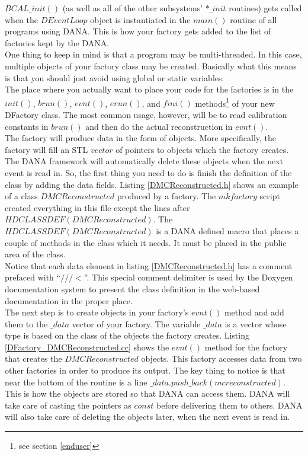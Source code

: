 \documentclass[12pt]{article}
\begin{document}
$BCAL\_init()$ (as well as all of the other subsystems' $*\_init$
routines) gets called when the $DEventLoop$ object is instantiated in
the $main()$ routine of all programs using DANA. This is how your
factory gets added to the list of factories kept by the DANA.\\

One thing to keep in mind is that a program may be multi-threaded.
In this case, multiple objects of your factory class may be created.
Basically what this means is that you should just avoid using global
or static variables.\\

The place where you actually want to place your code for the
factories is in the $init()$, $brun()$, $evnt()$, $erun()$, and $fini()$
methods\footnote{see section \ref{enduser}} of your new DFactory class.
The most common usage, however, will be to read calibration constants in
$brun()$ and then do the actual reconstruction in $evnt()$.\\

The factory will produce data in the form of objects. More specifically,
the factory will fill an STL $vector$ of pointers to objects
which the factory creates. The DANA framework will automatically delete
these objects when the next event is read in. So, the first thing
you need to do is finish the definition of the class by adding the
data fields. Listing \ref{DMCReconstructed.h} shows an example of a class
$DMCReconstructed$ produced by a factory. The $mkfactory$ script created
everything in this file except the lines after $HDCLASSDEF(DMCReconstructed)$.
The $HDCLASSDEF(DMCReconstructed)$
is a DANA defined macro that places a couple of methods in the
class which it needs. It must be placed in the public area of the class.\\

Notice that each data element in listing \ref{DMCReconstructed.h} has a
comment prefaced with ``$///<$''. This special comment delimiter
is used by the Doxygen documentation system to present the class
definition in the web-based documentation in the proper place.\\




The next step is to create objects in your factory's $evnt()$ method
and add them to the $\_data$ vector of your factory. The variable
$\_data$ is a vector whose type is based on the class of the objects
the factory creates. Listing \ref{DFactory_DMCReconstructed.cc} shows
the $evnt()$ method for the factory that creates the $DMCReconstructed$
objects. This factory accesses data from two other factories in
order to produce its output. The key thing to notice is that near the bottom
of the routine is a line $\_data.push\_back(mcreconstructed)$. This
is how the objects are stored so that DANA can access them. DANA
will take care of casting the pointers as $const$ before delivering them
to others. DANA will also take care of deleting the objects later, when
the next event is read in.\\
\end{document}
